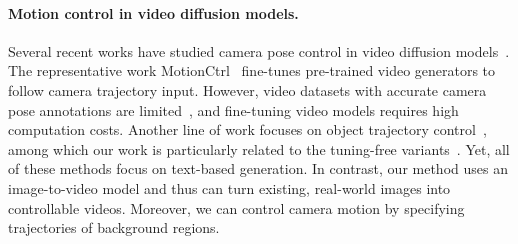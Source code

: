 \paragraph{Motion control in video diffusion models.}
Several recent works have studied camera pose control in video diffusion models~\citep{CameraCtrl,xu2024camco,kuang2024collaborative,MotionMaster,xiao2024video,hou2024training,bahmani2024vd3d,li2024image,zhang2024dragentity}.
The representative work MotionCtrl~\citep{MotionCtrl} fine-tunes pre-trained video generators to follow camera trajectory input. 
However, video datasets with accurate camera pose annotations are limited~\citep{RealEstate10k}, and fine-tuning video models requires high computation costs.
Another line of work focuses on object trajectory control~\citep{wang2023videocomposer,yin2023dragnuwa,wu2024draganything,zhou2024trackgo,wang2024boximator,zhang2024tora}, among which our work is particularly related to the tuning-free variants~\citep{qiu2024freetraj,ma2023trailblazer,DirectAVideo,jain2024peekaboo,Img2VidAnim-Zero}.
Yet, all of these methods focus on text-based generation. In contrast, our method uses an image-to-video model and thus can turn existing, real-world images into controllable videos.
Moreover, we can control camera motion by specifying trajectories of background regions. %



